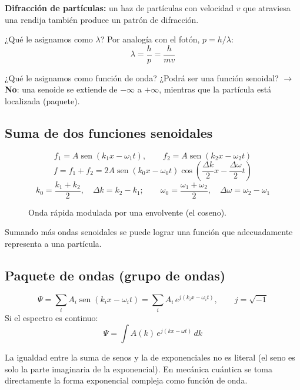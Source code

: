 \documentclass[11pt,a4paper]{article}
\DeclareMathOperator{\sen}{sen}
\begin{document}
\textbf{Difracción de partículas:} un haz de partículas con velocidad $v$ que atraviesa una rendija también produce
un patrón de difracción.

¿Qué le asignamos como $\lambda$? Por analogía con el fotón, $p=h/\lambda$:
\[
\boxed{\lambda=\frac{h}{p}=\frac{h}{mv}}
\]

¿Qué le asignamos como función de onda? ¿Podrá ser una función senoidal? $\rightarrow$ \textbf{No}: una senoide se
extiende de $-\infty$ a $+\infty$, mientras que la partícula está localizada (paquete).

\subsection{Suma de dos funciones senoidales}
\[
f_1=A\sen(k_1x-\omega_1t),\qquad f_2=A\sen(k_2x-\omega_2t)
\]
\[
f=f_1+f_2=2A\sen(k_0x-\omega_0t)\cos\!\left(\frac{\Delta k}{2}x-\frac{\Delta\omega}{2}t\right)
\]
\[
k_0=\frac{k_1+k_2}{2},\quad \Delta k=k_2-k_1;\qquad \omega_0=\frac{\omega_1+\omega_2}{2},\quad \Delta\omega=\omega_2-\omega_1
\]

\begin{figure}[H]
\centering
{}
\caption{Onda rápida modulada por una envolvente (el coseno).}
\end{figure}

Sumando más ondas senoidales se puede lograr una función que adecuadamente representa a una partícula.

\subsection{Paquete de ondas (grupo de ondas)}
\[
\Psi=\sum_i A_i\sen(k_ix-\omega_it)=\sum_i A_i\,e^{j(k_ix-\omega_it)},\qquad j=\sqrt{-1}
\]
Si el espectro es continuo:
\[
\Psi=\int A(k)\,e^{j(kx-\omega t)}\,dk
\]

\begin{obs}
La igualdad entre la suma de senos y la de exponenciales no es literal (el seno es solo la parte imaginaria de la
exponencial). En mecánica cuántica se toma directamente la forma exponencial compleja como función de onda.
\end{obs}
\end{document}
